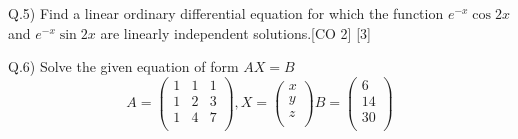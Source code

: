 \documentclass[12pt]{article}
\begin{document}
				\begin{flushleft}
					Q.5) Find a linear ordinary differential equation for which the function $e^{-x}\cos{2x}$ and $e^{-x}\sin{2x}$ are linearly independent solutions.\hspace{0.7cm}[CO 2] [3]
				\end{flushleft}
							\begin{flushleft}
					Q.6) Solve the given equation of form $AX=B$
				\[
				A=
				\begin{pmatrix}
					1 & 1 & 1 \\
					1 & 2 & 3 \\
					1 & 4 & 7 \\
				\end{pmatrix}
				,
				X=
				\begin{pmatrix}
					x \\
					y \\
					z \\
				\end{pmatrix}
				B=
				\begin{pmatrix}
					6  \\
					14 \\
					30 \\
				\end{pmatrix}
				\]
								\end{flushleft}
													
			
												
				
				
			
			
							
								
\end{document}
